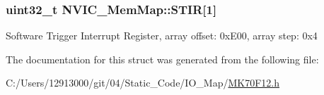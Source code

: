 \subsubsection[{S\+T\+I\+R}]{\setlength{\rightskip}{0pt plus 5cm}uint32\+\_\+t N\+V\+I\+C\+\_\+\+Mem\+Map\+::\+S\+T\+I\+R\mbox{[}1\mbox{]}}\label{struct_n_v_i_c___mem_map_a417658a729224de65052153f5c2cc419}
Software Trigger Interrupt Register, array offset\+: 0x\+E00, array step\+: 0x4 

The documentation for this struct was generated from the following file\+:\begin{DoxyCompactItemize}
\item 
C\+:/\+Users/12913000/git/04/\+Static\+\_\+\+Code/\+I\+O\+\_\+\+Map/\hyperlink{_m_k70_f12_8h}{M\+K70\+F12.\+h}\end{DoxyCompactItemize}
